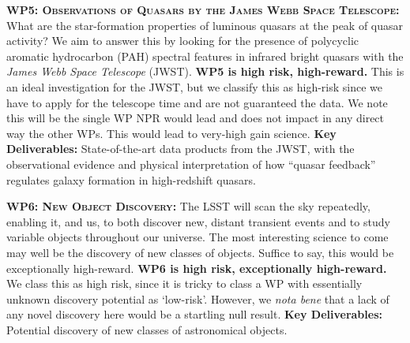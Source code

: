 \documentclass[oneside, a4paper, onecolumn, 11pt]{article}
\begin{document}
\smallskip
\smallskip
\noindent
\textbf{\textsc{WP5: Observations of Quasars by the James Webb Space Telescope:}} 
What are the star-formation properties of luminous quasars at the peak
of quasar activity?  We aim to answer this by looking for the presence
of polycyclic aromatic hydrocarbon (PAH) spectral features in infrared
bright quasars with the {\it James Webb Space Telescope} (JWST).  {\bf
WP5 is high risk, high-reward.}  This is an ideal investigation for
the JWST, but we classify this as high-risk since we have to apply for
the telescope time and are not guaranteed the data.  We note this will
be the single WP NPR would lead and does not impact in any direct way
the other WPs. This would lead to very-high gain science.  {\bf Key
Deliverables:} State-of-the-art data products from the JWST,
with the observational evidence and physical interpretation of how
``quasar feedback'' regulates galaxy formation in high-redshift
quasars.


\smallskip
\smallskip
\noindent
\textbf{\textsc{WP6: New Object Discovery:}} 
The LSST will scan the sky repeatedly, enabling it, and us, to both
discover new, distant transient events and to study variable objects
throughout our universe. The most interesting science to come may well
be the discovery of new classes of objects. Suffice to say, this would be exceptionally high-reward. 
{\bf WP6 is high risk, exceptionally high-reward.}
We class this as high risk, since it is tricky to class a WP
with essentially unknown discovery potential as `low-risk'.
However, we {\it nota bene} that a lack of any novel discovery here would 
be a startling null result.  
{\bf Key Deliverables:} Potential discovery of new classes of astronomical objects. 
\end{document}

